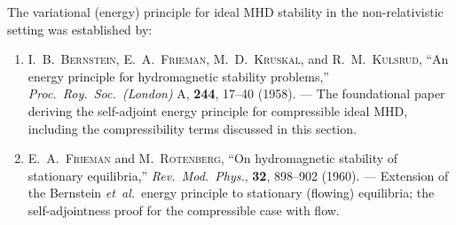 The variational (energy) principle for ideal MHD stability in the
non-relativistic setting was established by:
\begin{enumerate}
\item I.~B.~\textsc{Bernstein}, E.~A.~\textsc{Frieman},
  M.~D.~\textsc{Kruskal}, and R.~M.~\textsc{Kulsrud},
  ``An energy principle for hydromagnetic stability problems,''
  \emph{Proc.\ Roy.\ Soc.\ (London)} A, \textbf{244}, 17--40 (1958).
  --- The foundational paper deriving the self-adjoint energy
  principle for compressible ideal MHD, including the compressibility
  terms discussed in this section.  \cite{Bernstein1958}

\item E.~A.~\textsc{Frieman} and M.~\textsc{Rotenberg},
  ``On hydromagnetic stability of stationary equilibria,''
  \emph{Rev.\ Mod.\ Phys.}, \textbf{32}, 898--902 (1960).
  --- Extension of the Bernstein \emph{et~al.}\ energy principle to
  stationary (flowing) equilibria; the self-adjointness proof for the
  compressible case with flow.  \cite{Frieman1960}
\end{enumerate}

